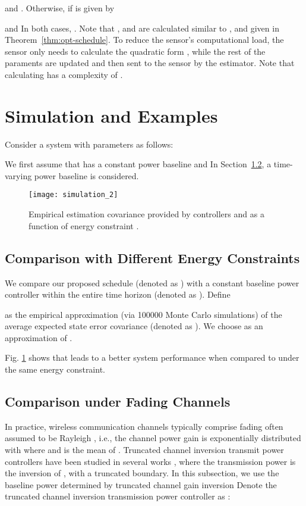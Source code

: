 \documentclass[twocolumn]{autart}    \usepackage{cite}
\begin{document}
{{and
.
Otherwise, if 
 is given by

and  In both cases, .
Note that ,  and  are calculated similar to ,
 and  given in Theorem~\ref{thm:opt-schedule}.
To reduce the sensor's computational load, the sensor only needs to
calculate the quadratic form ,
while the rest of the paraments are updated and then sent to the sensor by the estimator.
Note that calculating 
has a complexity of .}






\section{Simulation and Examples}
\label{sec:simulation}
{
Consider a system with parameters as follows:

}
{We first assume that 
has a constant power baseline
 and 
In Section~\ref{subsec:Comparison under Time-varying channel power gains},
a time-varying power baseline is considered.}




\begin{figure}[thp]
  \centering
  \texttt{[image: simulation\_2]}
  \caption{Empirical estimation covariance provided by  controllers  and  as a function of energy constraint .} \label{fig:simulation_2}
  \vspace{-1mm}
\end{figure}

\subsection{Comparison with Different Energy Constraints}
We compare our proposed schedule
 (denoted as )
with a constant baseline power controller
within the entire time horizon (denoted as ).
Define

as the empirical approximation (via 100000 Monte Carlo simulations) of the average expected state error covariance (denoted as ). We choose  as an approximation of .

Fig. \ref{fig:simulation_2} shows that  leads to a better system performance when compared to  under the same energy constraint.

\subsection{Comparison under Fading Channels }\label{subsec:Comparison under Time-varying channel power gains}
In practice, wireless communication channels
typically comprise fading often assumed to be Rayleigh \cite{rappaport1996wireless}, i.e., the channel power gain  is exponentially distributed with 
where  and  is the mean of .
{Truncated channel inversion transmit
power controllers have been studied in several works
\cite{quevedo2012kalman,leong2012power,goldsmith1997capacity}, where the transmission power is the inversion of ,
with a truncated boundary. In this subsection, we use the baseline power
determined by truncated channel gain inversion }
Denote the truncated channel inversion transmission power controller as :

}
\end{document}
